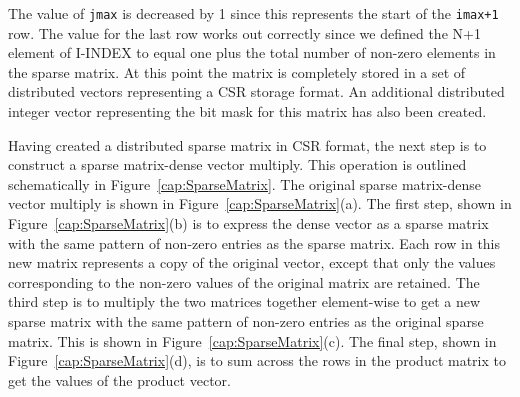 The value of \texttt{jmax} is decreased by 1 since this represents
the start of the \texttt{imax+1} row. The value for the last row works
out correctly since we defined the N+1 element of I-INDEX to equal
one plus the total number of non-zero elements in the sparse matrix.
At this point the matrix is completely stored in a set of distributed
vectors representing a CSR storage format. An additional distributed
integer vector representing the bit mask for this matrix has also
been created.

Having created a distributed sparse matrix in CSR format, the next
step is to construct a sparse matrix-dense vector multiply. This operation
is outlined schematically in Figure~\ref{cap:SparseMatrix}. The
original sparse matrix-dense vector multiply is shown in Figure~\ref{cap:SparseMatrix}(a).
The first step, shown in Figure~\ref{cap:SparseMatrix}(b) is to
express the dense vector as a sparse matrix with the same pattern
of non-zero entries as the sparse matrix. Each row in this new matrix
represents a copy of the original vector, except that only the values
corresponding to the non-zero values of the original matrix are retained.
The third step is to multiply the two matrices together element-wise
to get a new sparse matrix with the same pattern of non-zero entries
as the original sparse matrix. This is shown in Figure~\ref{cap:SparseMatrix}(c).
The final step, shown in Figure~\ref{cap:SparseMatrix}(d), is to
sum across the rows in the product matrix to get the values of the
product vector.

